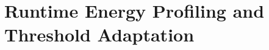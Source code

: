 \chapter{Runtime Energy Profiling and Threshold Adaptation}

\newcommand{\nn}{\textsc{Opta}}












